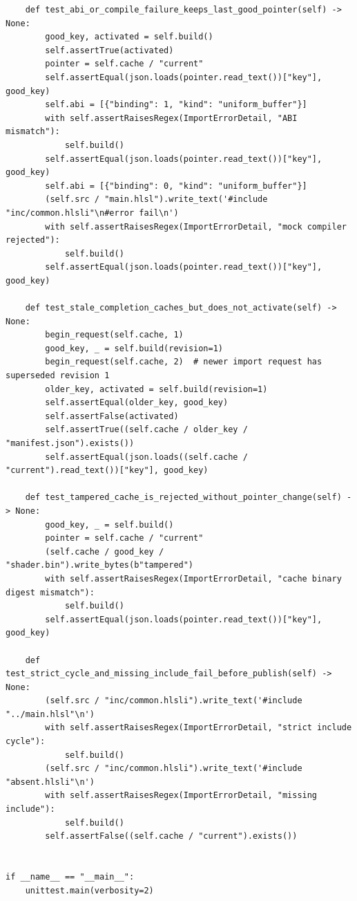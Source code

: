 \begin{verbatim}
    def test_abi_or_compile_failure_keeps_last_good_pointer(self) -> None:
        good_key, activated = self.build()
        self.assertTrue(activated)
        pointer = self.cache / "current"
        self.assertEqual(json.loads(pointer.read_text())["key"], good_key)
        self.abi = [{"binding": 1, "kind": "uniform_buffer"}]
        with self.assertRaisesRegex(ImportErrorDetail, "ABI mismatch"):
            self.build()
        self.assertEqual(json.loads(pointer.read_text())["key"], good_key)
        self.abi = [{"binding": 0, "kind": "uniform_buffer"}]
        (self.src / "main.hlsl").write_text('#include "inc/common.hlsli"\n#error fail\n')
        with self.assertRaisesRegex(ImportErrorDetail, "mock compiler rejected"):
            self.build()
        self.assertEqual(json.loads(pointer.read_text())["key"], good_key)

    def test_stale_completion_caches_but_does_not_activate(self) -> None:
        begin_request(self.cache, 1)
        good_key, _ = self.build(revision=1)
        begin_request(self.cache, 2)  # newer import request has superseded revision 1
        older_key, activated = self.build(revision=1)
        self.assertEqual(older_key, good_key)
        self.assertFalse(activated)
        self.assertTrue((self.cache / older_key / "manifest.json").exists())
        self.assertEqual(json.loads((self.cache / "current").read_text())["key"], good_key)

    def test_tampered_cache_is_rejected_without_pointer_change(self) -> None:
        good_key, _ = self.build()
        pointer = self.cache / "current"
        (self.cache / good_key / "shader.bin").write_bytes(b"tampered")
        with self.assertRaisesRegex(ImportErrorDetail, "cache binary digest mismatch"):
            self.build()
        self.assertEqual(json.loads(pointer.read_text())["key"], good_key)

    def test_strict_cycle_and_missing_include_fail_before_publish(self) -> None:
        (self.src / "inc/common.hlsli").write_text('#include "../main.hlsl"\n')
        with self.assertRaisesRegex(ImportErrorDetail, "strict include cycle"):
            self.build()
        (self.src / "inc/common.hlsli").write_text('#include "absent.hlsli"\n')
        with self.assertRaisesRegex(ImportErrorDetail, "missing include"):
            self.build()
        self.assertFalse((self.cache / "current").exists())


if __name__ == "__main__":
    unittest.main(verbosity=2)
\end{verbatim}

